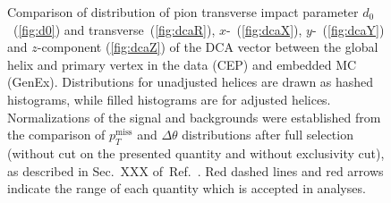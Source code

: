 \begin{figure}[ht]
{\begin{subfigure}[b]{\linewidth}
  \end{subfigure}
  \begin{minipage}[t][1.042\linewidth][t]{\linewidth}\vspace{10pt}
    \caption[Comparison of distribution of pion $d_{0}$ and components of DCA vector in the data and embedded MC, before and after adjustment of TPC pointing resolution.]
    {Comparison of distribution of pion transverse impact parameter $d_{0}$~(\ref{fig:d0}) and transverse~(\ref{fig:dcaR}), $x$-~(\ref{fig:dcaX}), $y$-~(\ref{fig:dcaY}) and $z$-component (\ref{fig:dcaZ}) of the DCA vector between the global helix and primary vertex in the data (CEP) and embedded MC (GenEx). Distributions for unadjusted helices are drawn as hashed histograms, while filled histograms are for adjusted helices. Normalizations of the signal and backgrounds were established from the comparison of $p_{T}^{\textrm{miss}}$ and $\Delta\theta$ distributions after full selection (without cut on the presented quantity and without exclusivity cut), as described in Sec.~XXX of~Ref.~\cite{AnalysisNoteRafal}. Red dashed lines and red arrows indicate the range of each quantity which is accepted in analyses.}\label{fig:pointingResComp}
  \end{minipage}
}%

\end{figure}
